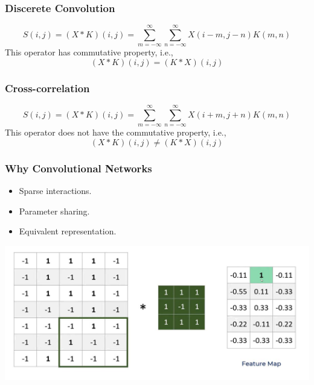 \documentclass[12pt,aspectratio=169]{beamer}
\begin{document}
\begin{frame}
\begin{figure}
\end{figure}
\end{frame}


\begin{frame}
\frametitle{Discerete Convolution}
\[
S(i,j)=(X*K)(i,j)=\sum_{m=-\infty}^{\infty}\sum_{n=-\infty}^{\infty}X(i-m,j-n)K(m,n)
\]
This operator has commutative property, i.e.,
\[
(X*K)(i,j)=(K*X)(i,j)
\]
\end{frame}

\begin{frame}
\frametitle{Cross-correlation}
\[
S(i,j)=(X*K)(i,j)=\sum_{m=-\infty}^{\infty}\sum_{n=-\infty}^{\infty}X(i+m,j+n)K(m,n)
\]
This operator does not have the commutative property, i.e.,
\[
(X*K)(i,j)\neq (K*X)(i,j)
\]
\end{frame}

\begin{frame}
\frametitle{Why Convolutional Networks}
\begin{itemize}
\item Sparse interactions.
\bigskip
\item Parameter sharing.
\bigskip
\item Equivalent representation.
\end{itemize}
\end{frame}

\begin{frame}
\begin{center}
\includegraphics[scale=0.4]{nine3}
\end{center}
\end{frame}
\end{document}
